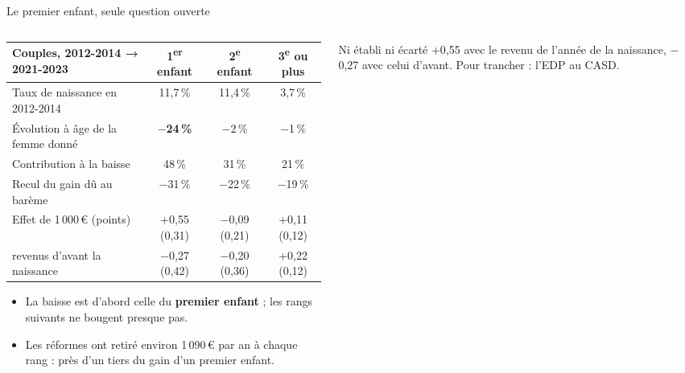 \documentclass[10pt,aspectratio=169]{beamer}
\begin{document}
\begin{frame}{Le premier enfant, seule question ouverte}
  \begin{columns}[T]
    \begin{column}{0.60\textwidth}
      \scriptsize\setlength{\tabcolsep}{3pt}
      \begin{tabular}{@{}lccc@{}}
        \toprule
        Couples, 2012-2014 → 2021-2023 & 1\textsuperscript{er} enfant & 2\textsuperscript{e} enfant & 3\textsuperscript{e} ou plus \\
        \midrule
        Taux de naissance en 2012-2014 & 11,7\,\% & 11,4\,\% & 3,7\,\% \\
        Évolution à âge de la femme donné & \textbf{$-$24\,\%} & $-$2\,\% & $-$1\,\% \\
        Contribution à la baisse & 48\,\% & 31\,\% & 21\,\% \\
        Recul du gain dû au barème & $-$31\,\% & $-$22\,\% & $-$19\,\% \\
        \midrule
        Effet de 1\,000\,€ (points) & +0,55 (0,31) & $-$0,09 (0,21) & +0,11 (0,12) \\
        \quad revenus d'avant la naissance & $-$0,27 (0,42) & $-$0,20 (0,36) & +0,22 (0,12) \\
        \bottomrule
      \end{tabular}
      \vspace{0.25cm}

      \small
      \begin{itemize}\setlength{\itemsep}{0.3em}
        \item La baisse est d'abord celle du \textbf{premier enfant} ; les rangs suivants ne bougent presque pas.
        \item Les réformes ont retiré environ 1\,090\,€ par an à chaque rang : près d'un tiers du gain d'un premier enfant.
      \end{itemize}
    \end{column}
    \begin{column}{0.36\textwidth}
      \vspace{0.1cm}
      \begin{callout}{Ni établi ni écarté}
        \scriptsize\RaggedRight +0,55 avec le revenu de l'année de la naissance, $-$0,27 avec celui d'avant. Pour trancher : l'EDP au CASD.
      \end{callout}
    \end{column}
  \end{columns}
\end{frame}
\end{document}
